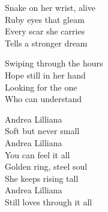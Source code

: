 \begin{lyrics}
Snake on her wrist, alive\\
Ruby eyes that gleam\\
Every scar she carries\\
Tells a stronger dream

Swiping through the hours\\
Hope still in her hand\\
Looking for the one\\
Who can understand

Andrea Lilliana\\
Soft but never small\\
Andrea Lilliana\\
You can feel it all\\
Golden ring, steel soul\\
She keeps rising tall\\
Andrea Lilliana\\
Still loves through it all

\end{lyrics}

